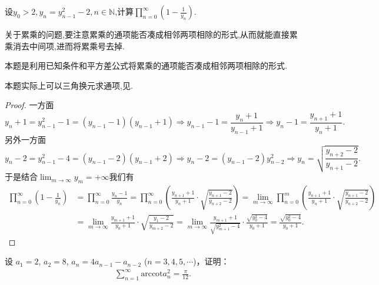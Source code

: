 \documentclass[../../main.tex]{subfiles}%
\begin{document}
\begin{example}
设\(y_0>2,y_n=y_{n - 1}^{2}-2,n\in\mathbb{N}\),计算\(\prod_{n = 0}^{\infty}(1 - \frac{1}{y_n})\).  
\end{example}
\begin{note}
关于累乘的问题,要注意累乘的通项能否凑成相邻两项相除的形式,从而就能直接累乘消去中间项,进而将累乘号去掉.

本题是利用已知条件和平方差公式将累乘的通项能否凑成相邻两项相除的形式.
\end{note}
\begin{remark}
本题实际上可以三角换元求通项,见.
\end{remark}
\begin{proof}
一方面
\[
y_n + 1=y_{n - 1}^{2}-1=(y_{n - 1}-1)(y_{n - 1}+1)\Rightarrow y_{n - 1}-1=\frac{y_n + 1}{y_{n - 1}+1}\Rightarrow y_n - 1=\frac{y_{n + 1}+1}{y_n + 1}.
\]
另外一方面
\[
y_n - 2=y_{n - 1}^{2}-4=(y_{n - 1}-2)(y_{n - 1}+2)\Rightarrow y_n - 2=(y_{n - 1}-2)y_{n - 2}^{2}\Rightarrow y_n=\sqrt{\frac{y_{n + 2}-2}{y_{n + 1}-2}}.
\]
于是结合\(\lim_{m\rightarrow\infty}y_m = +\infty\)我们有
\begin{align*}
\prod_{n = 0}^{\infty}\left(1-\frac{1}{y_n}\right)&=\prod_{n=0}^{\infty}{\frac{y_n-1}{y_n}}=\prod_{n = 0}^{\infty}\left(\frac{y_{n + 1}+1}{y_n + 1}\cdot\sqrt{\frac{y_{n + 1}-2}{y_{n + 2}-2}}\right)
=\lim_{m\rightarrow\infty}\prod_{n = 0}^{m}\left(\frac{y_{n + 1}+1}{y_n + 1}\cdot\sqrt{\frac{y_{n + 1}-2}{y_{n + 2}-2}}\right)\\
&=\lim_{m\rightarrow\infty}\frac{y_{m + 1}+1}{y_0 + 1}\cdot\sqrt{\frac{y_1 - 2}{y_{m + 2}-2}}
=\lim_{m\rightarrow\infty}\frac{y_{m + 1}+1}{\sqrt{y_{m + 1}^{2}-4}}\cdot\frac{\sqrt{y_0^{2}-4}}{y_0 + 1}
=\frac{\sqrt{y_0^{2}-4}}{y_0 + 1}.
\end{align*}
\end{proof}

\begin{example}
设 $a_1=2$, $a_2=8$, $a_n=4a_{n-1}-a_{n-2}$ ($n=3,4,5,\cdots$)，证明：
\begin{align*}
\sum_{n=1}^{\infty} \text{arccot} a_n^2 = \frac{\pi}{12}.
\end{align*}
\end{example}
\end{document}
